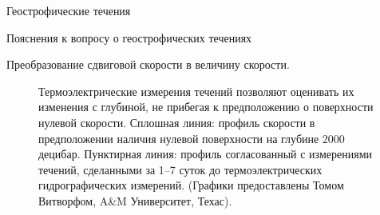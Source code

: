 \begin{chapter}{Геострофические течения}
\begin{section}{Пояснения к вопросу о геострофических течениях}
\begin{paragraph}{Преобразование сдвиговой скорости в величину скорости. }
\begin{enumerate}
\begin{figure}[t!]
\caption{Термоэлектрические измерения течений позволяют оценивать их
изменения с глубиной, не прибегая к предположению о поверхности
нулевой скорости. Сплошная линия: профиль скорости в предположении
наличия нулевой поверхности на глубине 2000 децибар. Пунктирная линия:
профиль согласованный с измерениями течений, сделанными за 1--7
суток до термоэлектрических гидрографических измерений. (Графики
предоставлены Томом Витворфом, A\&M Университет, Техас).}
\label{fig:whitplot}
\end{figure}
%


\end{enumerate}
\end{paragraph}
\end{section}
\end{chapter}

